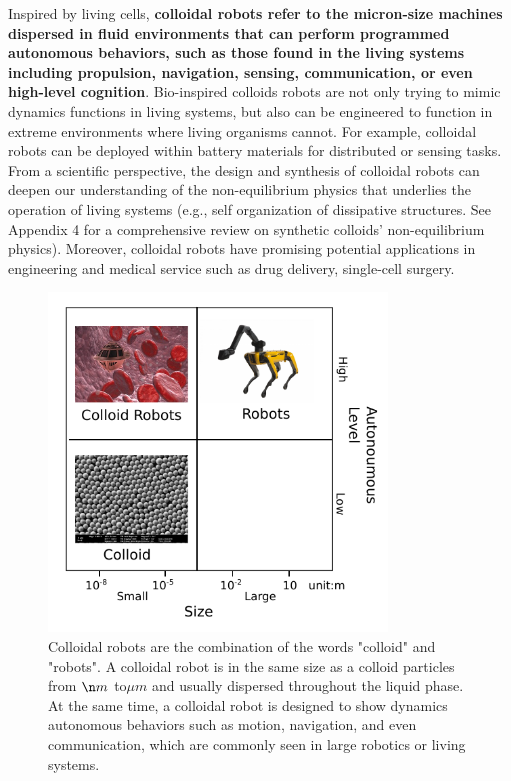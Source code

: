Inspired by living cells, \textbf{colloidal robots refer to the micron-size machines  dispersed in fluid environments that can perform  programmed autonomous behaviors, such as those found in the living systems including propulsion, navigation, sensing, communication, or even high-level cognition}. Bio-inspired colloids robots are not only trying to mimic dynamics functions in living systems, but also can be engineered to function in extreme environments where living organisms cannot. For example, colloidal robots can be deployed within battery materials for distributed or sensing tasks. From a scientific perspective, the design and synthesis of colloidal robots can deepen our understanding of the non-equilibrium physics that underlies the operation of living systems (e.g., self organization of dissipative structures. See Appendix 4 for a comprehensive review on  synthetic colloids' non-equilibrium physics). Moreover, colloidal robots have promising potential applications in engineering and medical service such as drug delivery\autocite{fu2012controlled,de2017micromotor}, single-cell surgery\autocite{li2017micro}. 

\begin{figure}
\centering
\includegraphics[width=9cm]{figures/1_1.pdf}
\caption{Colloidal robots are the combination of the words "colloid" and "robots". A colloidal robot is in the same size as a colloid particles from $\n m$ to$\mu m$ and usually dispersed throughout the liquid phase. At the same time, a colloidal robot is designed to show dynamics autonomous behaviors such as motion, navigation, and even communication, which are commonly seen in large robotics or living systems.}
\label{fig:1.1}
\end{figure}


